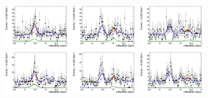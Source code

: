 \begin{figure}[!htbp]
\begin{center}
 \includegraphics[width=0.3\textwidth]{figures_and_tables/modeling_xchecks/plots/ZToUpsilon1SPhoton_Cat0_signalStrenght_20/Cat0_mMuMNU_fit_s}
\includegraphics[width=0.3\textwidth]{figures_and_tables/modeling_xchecks/plots/ZToUpsilon2SPhoton_Cat0_signalStrenght_20/Cat0_mMuMNU_fit_s}
\includegraphics[width=0.3\textwidth]{figures_and_tables/modeling_xchecks/plots/ZToUpsilon3SPhoton_Cat0_signalStrenght_20/Cat0_mMuMNU_fit_s}
\includegraphics[width=0.3\textwidth]{figures_and_tables/modeling_xchecks/plots/ZToUpsilon1SPhoton_Cat0_signalStrenght_50/Cat0_mMuMNU_fit_s}
\includegraphics[width=0.3\textwidth]{figures_and_tables/modeling_xchecks/plots/ZToUpsilon2SPhoton_Cat0_signalStrenght_50/Cat0_mMuMNU_fit_s}
\includegraphics[width=0.3\textwidth]{figures_and_tables/modeling_xchecks/plots/ZToUpsilon3SPhoton_Cat0_signalStrenght_50/Cat0_mMuMNU_fit_s}

\end{center}
\end{figure}
